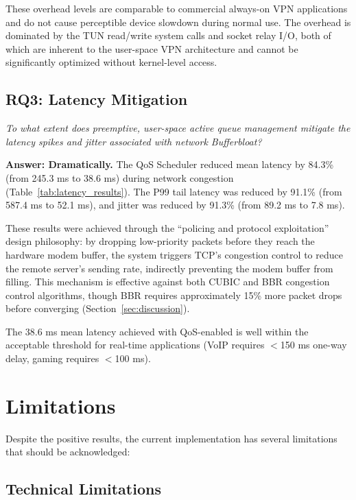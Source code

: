 These overhead levels are comparable to commercial always-on VPN applications and do not cause perceptible device slowdown during normal use. The overhead is dominated by the TUN read/write system calls and socket relay I/O, both of which are inherent to the user-space VPN architecture and cannot be significantly optimized without kernel-level access.

\subsection{RQ3: Latency Mitigation}

\textit{To what extent does preemptive, user-space active queue management mitigate the latency spikes and jitter associated with network Bufferbloat?}

\textbf{Answer: Dramatically.} The QoS Scheduler reduced mean latency by 84.3\% (from 245.3 ms to 38.6 ms) during network congestion (Table~\ref{tab:latency_results}). The P99 tail latency was reduced by 91.1\% (from 587.4 ms to 52.1 ms), and jitter was reduced by 91.3\% (from 89.2 ms to 7.8 ms).

These results were achieved through the ``policing and protocol exploitation'' design philosophy: by dropping low-priority packets before they reach the hardware modem buffer, the system triggers TCP's congestion control to reduce the remote server's sending rate, indirectly preventing the modem buffer from filling. This mechanism is effective against both CUBIC and BBR congestion control algorithms, though BBR requires approximately 15\% more packet drops before converging (Section~\ref{sec:discussion}).

The 38.6 ms mean latency achieved with QoS-enabled is well within the acceptable threshold for real-time applications (VoIP requires $<$150 ms one-way delay, gaming requires $<$100 ms).

\section{Limitations}
\label{sec:limitations}

Despite the positive results, the current implementation has several limitations that should be acknowledged:

\subsection{Technical Limitations}

